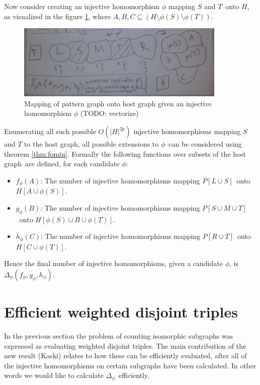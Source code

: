 \documentclass[a4paper,11pt]{report}
\theoremstyle{plain}
\theoremstyle{definition}
\begin{document}
Now consider creating an injective homomorphism $\phi$ mapping $S$ and $T$ onto $H$, as visualized in the figure \ref{fig:homo-viz},
where $A,B,C \subseteq (H \setminus \phi(S) \setminus \phi(T))$.

\begin{figure}[here]
\centering
\includegraphics[width=10cm]{images/sketch_homo.png} 
\caption[Mapping]{Mapping of pattern graph onto host graph given an injective homomorphism $\phi$ (TODO: vectorize)}
\label{fig:homo-viz}
\end{figure}

Enumerating all such possible $O(|H|^{2p})$ injective homomorphisms mapping $S$ and $T$ to the host graph,
all possible extensions to $\phi$ can be considered using theorem \ref{thm:fomin}.
Formally the following functions over subsets of the host graph are defined, for each candidate $\phi$:

\begin{itemize}
\item $f_\phi(A)$: The number of injective homomorphisms mapping $P[L \cup S]$ onto $H[A \cup \phi(S)]$.
\item $g_\phi(B)$: The number of injective homomorphisms mapping $P[S \cup M \cup T]$ onto $H[\phi(S) \cup B \cup \phi(T)]$.
\item $h_\phi(C)$: The number of injective homomorphisms mapping $P[R \cup T]$ onto $H[C \cup \phi(T)]$.
\end{itemize}

Hence the final number of injective homomorphisms, given a candidate $\phi$, is $\Delta_\phi(f_\phi, g_\phi, h_\phi)$.

\section{Efficient weighted disjoint triples}
In the previous section the problem of counting isomorphic subgraphs was expressed as evaluating weighted disjoint triples.
The main contribution of the new result (Kaski) relates to how these can be efficiently evaluated, after all of the
injective homomorphisms on certain subgraphs have been calculated.
In other words we would like to calculate $\Delta_\phi$ efficiently.
\end{document}
